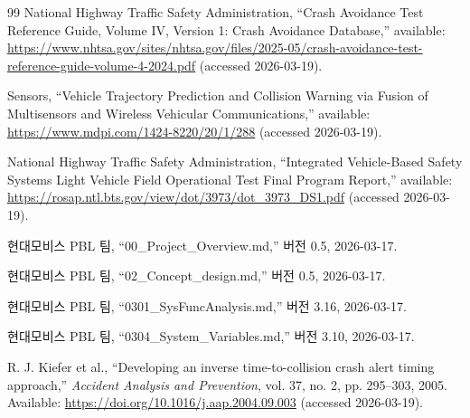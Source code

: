 \documentclass[10pt,a4paper,twocolumn]{article}
\begin{document}
\begin{thebibliography}{99}
National Highway Traffic Safety Administration, ``Crash Avoidance Test Reference Guide, Volume IV, Version 1: Crash Avoidance Database,'' available: \url{https://www.nhtsa.gov/sites/nhtsa.gov/files/2025-05/crash-avoidance-test-reference-guide-volume-4-2024.pdf} (accessed 2026-03-19).

Sensors, ``Vehicle Trajectory Prediction and Collision Warning via Fusion of Multisensors and Wireless Vehicular Communications,'' available: \url{https://www.mdpi.com/1424-8220/20/1/288} (accessed 2026-03-19).

National Highway Traffic Safety Administration, ``Integrated Vehicle-Based Safety Systems Light Vehicle Field Operational Test Final Program Report,'' available: \url{https://rosap.ntl.bts.gov/view/dot/3973/dot_3973_DS1.pdf} (accessed 2026-03-19).

현대모비스 PBL 팀, ``00\_Project\_Overview.md,'' 버전 0.5, 2026-03-17.

현대모비스 PBL 팀, ``02\_Concept\_design.md,'' 버전 0.5, 2026-03-17.

현대모비스 PBL 팀, ``0301\_SysFuncAnalysis.md,'' 버전 3.16, 2026-03-17.

현대모비스 PBL 팀, ``0304\_System\_Variables.md,'' 버전 3.10, 2026-03-17.

R. J. Kiefer et al., ``Developing an inverse time-to-collision crash alert timing approach,'' \emph{Accident Analysis and Prevention}, vol. 37, no. 2, pp. 295--303, 2005. Available: \url{https://doi.org/10.1016/j.aap.2004.09.003} (accessed 2026-03-19).

\end{thebibliography}
\end{document}
